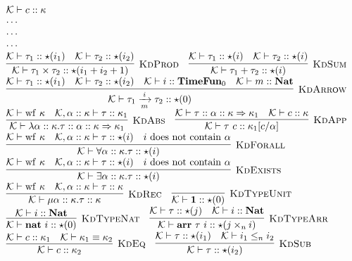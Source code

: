 \documentclass[fleqn]{article}
\begin{document}
\[
\begin{array}{l}
	\mathcal{K} \vdash c :: \kappa \\
	\cdots \\
	\cdots \\
	\cdots \\
	\infer[\textsc{KdProd}]{\mathcal{K} \vdash \tau_1 \times \tau_2 :: \star(i_1+i_2+1)}{\mathcal{K} \vdash \tau_1 :: \star(i_1) & \mathcal{K} \vdash \tau_2 :: \star(i_2)} \hspace{1em}
	\infer[\textsc{KdSum}]{\mathcal{K} \vdash \tau_1 + \tau_2 :: \star(i)}{\mathcal{K} \vdash \tau_1 :: \star(i) & \mathcal{K} \vdash \tau_2 :: \star(i)} \\
	\infer[\textsc{KdArrow}]{\mathcal{K} \vdash \tau_1 \xrightarrow[m]{i} \tau_2 :: \star(0)}{\mathcal{K} \vdash \tau_1 :: \star(i_1) & \mathcal{K} \vdash \tau_2 :: \star(i_2) & \mathcal{K} \vdash i :: \mathbf{TimeFun}_0 & \mathcal{K} \vdash m :: \mathbf{Nat}} \\
	\infer[\textsc{KdAbs}]{\mathcal{K} \vdash \lambda \alpha :: \kappa. \tau :: \alpha :: \kappa \Rightarrow \kappa_1}{\mathcal{K} \vdash \mathrm{wf}~\kappa & \mathcal{K},\alpha::\kappa \vdash \tau :: \kappa_1} \hspace{1em}
	\infer[\textsc{KdApp}]{\mathcal{K} \vdash \tau~c :: \kappa_1[c/\alpha]}{\mathcal{K} \vdash \tau :: \alpha :: \kappa \Rightarrow \kappa_1 & \mathcal{K} \vdash c :: \kappa} \\
	\infer[\textsc{KdForall}]{\mathcal{K} \vdash \forall \alpha :: \kappa. \tau :: \star(i)}{\mathcal{K} \vdash \mathrm{wf}~\kappa & \mathcal{K},\alpha :: \kappa \vdash \tau :: \star(i) & i~\mathrm{does~not~contain}~\alpha} \\
	\infer[\textsc{KdExists}]{\mathcal{K} \vdash \exists \alpha :: \kappa. \tau :: \star(i)}{\mathcal{K} \vdash \mathrm{wf}~\kappa & \mathcal{K},\alpha :: \kappa \vdash \tau :: \star(i) & i~\mathrm{does~not~contain}~\alpha} \\
	\infer[\textsc{KdRec}]{\mathcal{K} \vdash \mu \alpha :: \kappa. \tau :: \kappa}{\mathcal{K} \vdash \mathrm{wf}~\kappa & \mathcal{K},\alpha::\kappa \vdash \tau :: \kappa} \hspace{1em}
	\infer[\textsc{KdTypeUnit}]{\mathcal{K} \vdash \mathbf{1} :: \star(0)}{} \\
	\infer[\textsc{KdTypeNat}]{\mathcal{K} \vdash \mathbf{nat}~i :: \star(0)}{\mathcal{K} \vdash i :: \mathbf{Nat}} \hspace{1em}
	\infer[\textsc{KdTypeArr}]{\mathcal{K} \vdash \mathbf{arr}~\tau~i :: \star(j \times_n i)}{\mathcal{K} \vdash \tau :: \star(j) & \mathcal{K} \vdash i :: \mathbf{Nat}} \\
	\infer[\textsc{KdEq}]{\mathcal{K} \vdash c :: \kappa_2}{\mathcal{K} \vdash c :: \kappa_1 & \mathcal{K} \vdash \kappa_1 \equiv \kappa_2} \hspace{1em}
	\infer[\textsc{KdSub}]{\mathcal{K} \vdash \tau :: \star(i_2)}{\mathcal{K} \vdash \tau :: \star(i_1) & \mathcal{K} \vdash i_1 \le_n i_2}
\end{array}
\]
\end{document}
